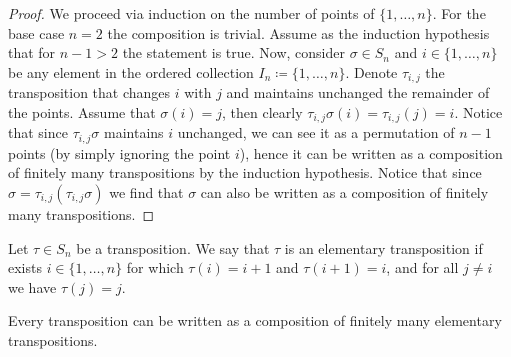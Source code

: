 \begin{proof}
    We proceed via induction on the number of points of \(\{1, \dots, n\}\). For
    the base case \(n = 2\) the composition is trivial. Assume as the induction
    hypothesis that for \(n - 1 > 2\) the statement is true. Now, consider
    \(\sigma \in S_n\) and \(i \in \{1, \dots, n\}\) be any element in
    the ordered collection \(I_n \coloneq \{1, \dots, n\}\). Denote \(\tau_{i, j}\) the
    transposition that changes \(i\) with \(j\) and maintains unchanged the
    remainder of the points. Assume that \(\sigma(i) = j\), then clearly
    \(\tau_{i, j} \sigma(i) = \tau_{i, j}(j) = i\). Notice that since \(\tau_{i,
        j} \sigma\) maintains \(i\) unchanged, we can see it as a permutation of \(n
    - 1\) points (by simply ignoring the point \(i\)), hence it can be written as
    a composition of finitely many transpositions by the induction hypothesis.
    Notice that since \(\sigma = \tau_{i, j} (\tau_{i, j} \sigma)\) we find that
    \(\sigma\) can also be written as a composition of finitely many
    transpositions.
\end{proof}

\begin{definition}
    Let \(\tau \in S_n\) be a transposition. We say that \(\tau\) is an
    elementary transposition if exists \(i \in \{1, \dots, n\}\) for which
    \(\tau(i) = i + 1\) and \(\tau(i + 1) = i\), and for all \(j \neq i\) we have
    \(\tau(j) = j\).
\end{definition}

\begin{proposition}
    Every transposition can be written as a composition of finitely many
    elementary transpositions.
\end{proposition}

